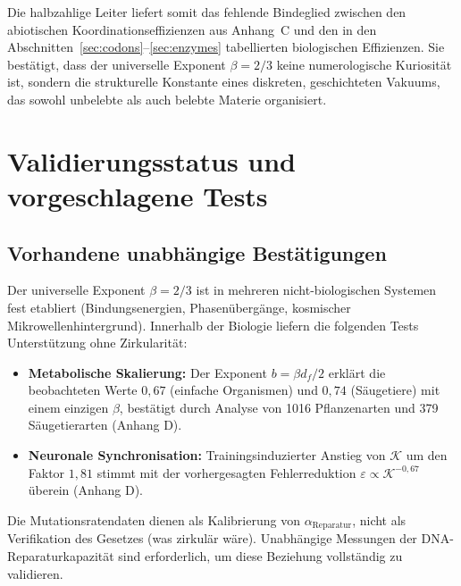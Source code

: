 \documentclass[12pt,a4paper]{article}
\newcommand{\REL}{\mathcal{K}}          %
\begin{document}
	Die halbzahlige Leiter liefert somit das fehlende Bindeglied zwischen den abiotischen Koordinationseffizienzen aus Anhang~C und den in den Abschnitten~\ref{sec:codons}–\ref{sec:enzymes} tabellierten biologischen Effizienzen. Sie bestätigt, dass der universelle Exponent \(\beta = 2/3\) keine numerologische Kuriosität ist, sondern die strukturelle Konstante eines diskreten, geschichteten Vakuums, das sowohl unbelebte als auch belebte Materie organisiert.
	
	\section{Validierungsstatus und vorgeschlagene Tests}
	\label{sec:validation}
	
	\subsection{Vorhandene unabhängige Bestätigungen}
	Der universelle Exponent \(\beta = 2/3\) ist in mehreren nicht-biologischen Systemen fest etabliert (Bindungsenergien, Phasenübergänge, kosmischer Mikrowellenhintergrund). Innerhalb der Biologie liefern die folgenden Tests Unterstützung ohne Zirkularität:
	\begin{itemize}
		\item \textbf{Metabolische Skalierung:} Der Exponent \(b = \beta d_f/2\) erklärt die beobachteten Werte \(0,67\) (einfache Organismen) und \(0,74\) (Säugetiere) mit einem einzigen \(\beta\), bestätigt durch Analyse von 1016 Pflanzenarten und 379 Säugetierarten (Anhang D).
		\item \textbf{Neuronale Synchronisation:} Trainingsinduzierter Anstieg von \(\REL\) um den Faktor \(1,81\) stimmt mit der vorhergesagten Fehlerreduktion \(\varepsilon \propto \REL^{-0,67}\) überein (Anhang D).
	\end{itemize}
	Die Mutationsratendaten dienen als Kalibrierung von \(\alpha_{\mathrm{Reparatur}}\), nicht als Verifikation des Gesetzes (was zirkulär wäre). Unabhängige Messungen der DNA-Reparaturkapazität sind erforderlich, um diese Beziehung vollständig zu validieren.
	
\end{document}
